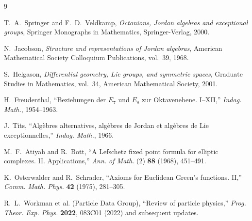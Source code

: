 \documentclass[11pt]{article}
\theoremstyle{plain}
\theoremstyle{definition}
\theoremstyle{remark}
\numberwithin{equation}{section}
\begin{document}

\begin{thebibliography}{9}

T.~A.~Springer and F.~D.~Veldkamp,
\textit{Octonions, Jordan algebras and exceptional groups},
Springer Monographs in Mathematics, Springer-Verlag, 2000.

N.~Jacobson,
\textit{Structure and representations of Jordan algebras},
American Mathematical Society Colloquium Publications, vol.~39, 1968.

S.~Helgason,
\textit{Differential geometry, Lie groups, and symmetric spaces},
Graduate Studies in Mathematics, vol.~34, American Mathematical Society, 2001.

H.~Freudenthal,
``Beziehungen der $E_7$ und $E_8$ zur Oktavenebene. I--XII,''
\textit{Indag. Math.}, 1954--1963.

J.~Tits,
``Algèbres alternatives, algèbres de Jordan et algèbres de Lie exceptionnelles,''
\textit{Indag. Math.}, 1966.

M.~F.~Atiyah and R.~Bott,
``A Lefschetz fixed point formula for elliptic complexes. II. Applications,''
\textit{Ann. of Math.} (2) \textbf{88} (1968), 451--491.

K.~Osterwalder and R.~Schrader,
``Axioms for Euclidean Green's functions. II,''
\textit{Comm. Math. Phys.} \textbf{42} (1975), 281--305.

R.~L.~Workman et al. (Particle Data Group),
``Review of particle physics,''
\textit{Prog. Theor. Exp. Phys.} \textbf{2022}, 083C01 (2022) and subsequent updates.

\end{thebibliography}
\end{document}
